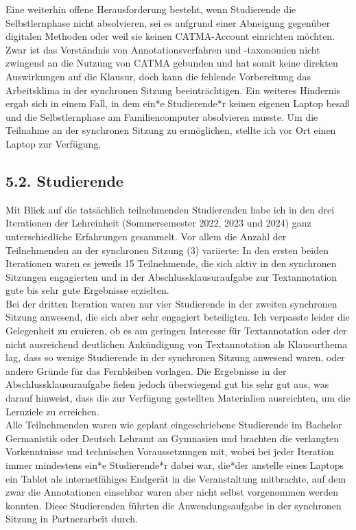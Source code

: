 \documentclass[
          a4paper,
        ]{article}
\begin{document}
Eine weiterhin offene Herausforderung besteht, wenn Studierende die
Selbstlernphase nicht absolvieren, sei es aufgrund einer Abneigung
gegenüber digitalen Methoden oder weil sie keinen CATMA-Account
einrichten möchten. Zwar ist das Verständnis von Annotationsverfahren
und -taxonomien nicht zwingend an die Nutzung von CATMA gebunden und hat
somit keine direkten Auswirkungen auf die Klausur, doch kann die
fehlende Vorbereitung das Arbeitsklima in der synchronen Sitzung
beeinträchtigen. Ein weiteres Hindernis ergab sich in einem Fall, in dem
ein*e Studierende*r keinen eigenen Laptop besaß und die Selbstlernphase
am Familiencomputer absolvieren musste. Um die Teilnahme an der
synchronen Sitzung zu ermöglichen, stellte ich vor Ort einen Laptop zur
Verfügung.

\subsection{5.2. Studierende}\label{studierende}

Mit Blick auf die tatsächlich teilnehmenden Studierenden habe ich in den
drei Iterationen der Lehreinheit (Sommersemester 2022, 2023 und 2024)
ganz unterschiedliche Erfahrungen gesammelt. Vor allem die Anzahl der
Teilnehmenden an der synchronen Sitzung (3) variierte: In den ersten
beiden Iterationen waren es jeweils 15 Teilnehmende, die sich aktiv in
den synchronen Sitzungen engagierten und in der Abschlussklausuraufgabe
zur Textannotation gute bis sehr gute Ergebnisse erzielten.\\
Bei der dritten Iteration waren nur vier Studierende in der zweiten
synchronen Sitzung anwesend, die sich aber sehr engagiert beteiligten.
Ich verpasste leider die Gelegenheit zu eruieren, ob es am geringen
Interesse für Textannotation oder der nicht ausreichend deutlichen
Ankündigung von Textannotation als Klausurthema lag, dass so wenige
Studierende in der synchronen Sitzung anwesend waren, oder andere Gründe
für das Fernbleiben vorlagen. Die Ergebnisse in der
Abschlussklausuraufgabe fielen jedoch überwiegend gut bis sehr gut aus,
was darauf hinweist, dass die zur Verfügung gestellten Materialien
ausreichten, um die Lernziele zu erreichen.\\
Alle Teilnehmenden waren wie geplant eingeschriebene Studierende im
Bachelor Germanistik oder Deutsch Lehramt an Gymnasien und brachten die
verlangten Vorkenntnisse und technischen Voraussetzungen mit, wobei bei
jeder Iteration immer mindestens ein*e Studierende*r dabei war, die*der
anstelle eines Laptops ein Tablet als internetfähiges Endgerät in die
Veranstaltung mitbrachte, auf dem zwar die Annotationen einsehbar waren
aber nicht selbst vorgenommen werden konnten. Diese Studierenden führten
die Anwendungsaufgabe in der synchronen Sitzung in Partnerarbeit durch.
\end{document}
